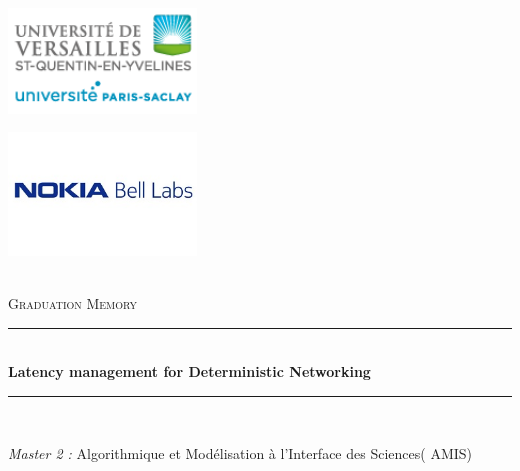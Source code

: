 \documentclass[a4paper,10pt]{report}
\newcommand{\reporttitle}{Latency management for Deterministic Networking}     %
\newcommand{\reportsubject}{Graduation Memory}
\newcommand{\HRule}{\rule{\linewidth}{0.5mm}}
\begin{document}
\begin{titlepage}

\begin{center}



\begin{minipage}[t]{0.48\textwidth}
  \begin{flushleft} \large
       \includegraphics [width=50mm]{logo.png} \\[0.5cm]
  \end{flushleft}
\end{minipage}
\begin{minipage}[t]{0.48\textwidth}
  \begin{flushright} \large
    \includegraphics [width=50mm]{logon.png} \\[0.5cm]
  \end{flushright}
\end{minipage}
 \\[3cm]

\textsc{\Large \reportsubject}\\[0.5cm]
\HRule \\[0.4cm]
{\huge \bfseries \reporttitle}\\[0.4cm]
\HRule \\[1.5cm]

\begin{minipage}[t]{1.0\textwidth}
  \begin{center} \large
    \emph{Master 2  :} 
   Algorithmique et Modélisation à l'Interface des Sciences( AMIS) \\

  \end{center}
  \end{minipage}
  \\[3cm]
 

\end{center}
\end{titlepage}
\end{document}
